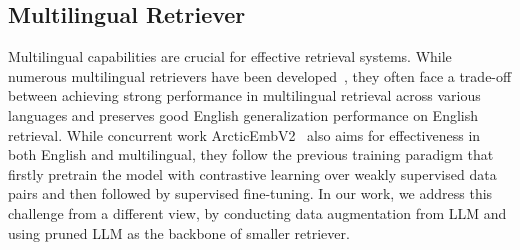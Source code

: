 \subsection{Multilingual Retriever}
Multilingual capabilities are crucial for effective retrieval systems.
While numerous multilingual retrievers have been developed~\citep{izacard2022unsup, wang2024me5, zhang2024mgte, chen-etal-2024-m3}, they often face a trade-off between achieving strong performance in multilingual retrieval across various languages and preserves good English generalization performance on English retrieval.
While concurrent work ArcticEmbV2~\citep{yu2024arcticembed} also aims for effectiveness in both English and multilingual, they follow the previous training paradigm that firstly pretrain the model with contrastive learning over weakly supervised data pairs and then followed by supervised fine-tuning.
In our work, we address this challenge from a different view, by conducting data augmentation from LLM and using pruned LLM as the backbone of smaller retriever.